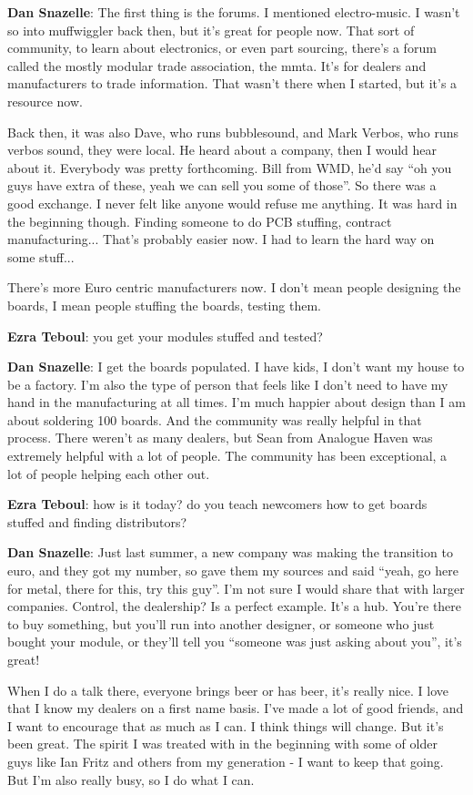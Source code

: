 \textbf{Dan Snazelle}: The first thing is the forums. I mentioned electro-music. I wasn't so into muffwiggler back then, but it's great for people now. That sort of community, to learn about electronics, or even part sourcing, there's a forum called the mostly modular trade association, the mmta. It's for dealers and manufacturers to trade information. That wasn't there when I started, but it's a resource now. 

Back then, it was also Dave, who runs bubblesound, and Mark Verbos, who runs verbos sound, they were local. He heard about a company, then I would hear about it. Everybody was pretty forthcoming. Bill from WMD, he'd say ``oh you guys have extra of these, yeah we can sell you some of those''. So there was a good exchange. I never felt like anyone would refuse me anything. It was hard in the beginning though. Finding someone to do PCB stuffing, contract manufacturing... That's probably easier now. I had to learn the hard way on some stuff... 

There's more Euro centric manufacturers now. I don't mean people designing the boards, I mean people stuffing the boards, testing them. 

\textbf{Ezra Teboul}: you get your modules stuffed and tested? 

\textbf{Dan Snazelle}: I get the boards populated. I have kids, I don't want my house to be a factory. I'm also the type of person that feels like I don't need to have my hand in the manufacturing at all times. I'm much happier about design than I am about soldering 100 boards. And the community was really helpful in that process. There weren't as many dealers, but Sean from Analogue Haven was extremely helpful with a lot of people. The community has been exceptional, a lot of people helping each other out. 

\textbf{Ezra Teboul}: how is it today? do you teach newcomers how to get boards stuffed and finding distributors? 

\textbf{Dan Snazelle}: Just last summer, a new company was making the transition to euro, and they got my number, so gave them my sources and said  ``yeah, go here for metal, there for this, try this guy''. I'm not sure I would share that with larger companies. Control, the dealership? Is a perfect example. It's a hub. You're there to buy something, but you'll run into another designer, or someone who just bought your module, or they'll tell you ``someone was just asking about you'', it's great!

When I do a talk there, everyone brings beer or has beer, it's really nice. I love that I know my dealers on a first name basis. I've made a lot of good friends, and I want to encourage that as much as I can. I think things will change. But it's been great. The spirit I was treated with in the beginning with some of older guys like Ian Fritz and others from my generation - I want to keep that going. But I'm also really busy, so I do what I can. 

